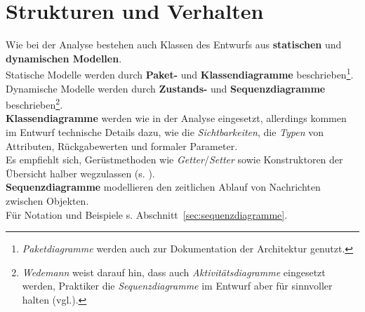 \section{Strukturen und Verhalten}
Wie bei der Analyse bestehen auch Klassen des Entwurfs aus \textbf{statischen} und \textbf{dynamischen Modellen}.\\

\noindent
Statische Modelle werden durch \textbf{Paket-} und \textbf{Klassendiagramme} beschrieben\footnote{
\textit{Paketdiagramme} werden auch zur Dokumentation der Architektur genutzt.
}.\\

Dynamische Modelle werden durch \textbf{Zustands-} und \textbf{Sequenzdiagramme} beschrieben\footnote{
\textit{Wedemann} weist darauf hin, dass auch \textit{Aktivitätsdiagramme} eingesetzt werden, Praktiker die \textit{Sequenzdiagramme} im Entwurf aber für sinnvoller halten (vgl.\cite[49]{Wed09b}).
}.\\

\noindent
\textbf{Klassendiagramme} werden wie in der Analyse eingesetzt, allerdings kommen im Entwurf technische Details dazu, wie die \textit{Sichtbarkeiten}, die \textit{Typen} von Attributen, Rückgabewerten und formaler Parameter.\\
Es empfiehlt sich, Gerüstmethoden wie \textit{Getter}/\textit{Setter} sowie Konstruktoren der Übersicht halber wegzulassen (s. \cite[50]{Wed09b}).\\

\noindent
\textbf{Sequenzdiagramme} modellieren den zeitlichen Ablauf von Nachrichten zwischen Objekten.\\
Für Notation und Beispiele s. Abschnitt~\ref{sec:sequenzdiagramme}.